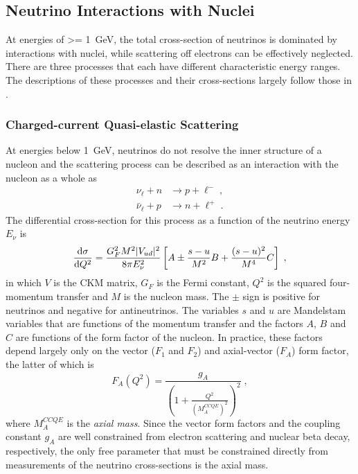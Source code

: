 \subsection{Neutrino Interactions with Nuclei}
\label{sec:neutrino-xsec}

At energies of \SI{>= 1}{\giga\eV}, the total cross-section of neutrinos is dominated by interactions with nuclei, while scattering off electrons can be effectively neglected.
There are three processes that each have different characteristic energy ranges.
The descriptions of these processes and their cross-sections largely follow those in .

\subsubsection{Charged-current Quasi-elastic Scattering}
At energies below \SI{1}{GeV}, neutrinos do not resolve the inner structure of a nucleon and the scattering process can be described as an interaction with the nucleon as a whole as
\begin{equation}
\begin{aligned}
    \nu_\ell + n &\rightarrow p + \ell^-\;,\\
    \bar{\nu}_\ell + p &\rightarrow n + \ell^+\;.
\end{aligned}
\end{equation}
The differential cross-section for this process as a function of the neutrino energy $E_\nu$ is
\begin{equation}
    \frac{\mathrm{d}\sigma}{\mathrm{d} Q^2} = \frac{G_F^2 M^2 |V_{ud}|^2}{8\pi E^2_\nu}
    \left[
        A \pm \frac{s-u}{M^2}B + \frac{(s-u)^2}{M^4}C
    \right]\;,\label{eq:ccqe-xsec}
\end{equation}
in which $V$ is the CKM matrix, $G_F$ is the Fermi constant, $Q^2$ is the squared four-momentum transfer and $M$ is the nucleon mass.
The $\pm$ sign is positive for neutrinos and negative for antineutrinos.
The variables $s$ and $u$ are Mandelstam variables that are functions of the momentum transfer and the factors $A$, $B$ and $C$ are functions of the form factor of the nucleon.
In practice, these factors depend largely only on the vector ($F_1$ and $F_2$) and axial-vector ($F_A$) form factor, the latter of which is
\begin{equation}
    F_A(Q^2) = \frac{g_A}{\left(1 + \frac{Q^2}{(M_A^{CCQE})^2}\right)^2}\;,\label{eq:axial-mass-form-factor}
\end{equation}
where $M_A^{CCQE}$ is the \emph{axial mass}.
Since the vector form factors and the coupling constant $g_A$ are well constrained from electron scattering and nuclear beta decay, respectively, the only free parameter that must be constrained directly from measurements of the neutrino cross-sections\cite{Lyubushkin:2009aa} is the axial mass.

